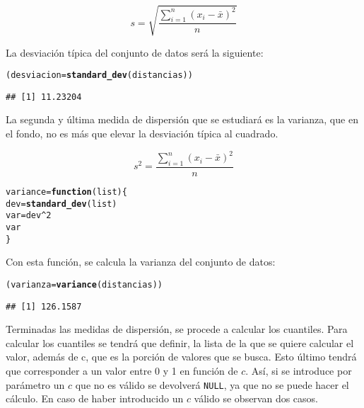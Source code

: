 \documentclass[12pt]{report}\usepackage[]{graphicx}\usepackage[dvipsnames]{xcolor}
\makeatletter
\newcommand{\hlnum}[1]{\textcolor[rgb]{0.686,0.059,0.569}{#1}}%
\newcommand{\hlopt}[1]{\textcolor[rgb]{0,0,0}{#1}}%
\newcommand{\hlstd}[1]{\textcolor[rgb]{0.345,0.345,0.345}{#1}}%
\newcommand{\hlkwa}[1]{\textcolor[rgb]{0.161,0.373,0.58}{\textbf{#1}}}%
\newcommand{\hlkwb}[1]{\textcolor[rgb]{0.69,0.353,0.396}{#1}}%
\newcommand{\hlkwc}[1]{\textcolor[rgb]{0.333,0.667,0.333}{#1}}%
\newcommand{\hlkwd}[1]{\textcolor[rgb]{0.737,0.353,0.396}{\textbf{#1}}}%
\newenvironment{kframe}{%
 \def\at@end@of@kframe{}%
 \ifinner\ifhmode%
  \def\at@end@of@kframe{\end{minipage}}%
  \begin{minipage}{\columnwidth}%
 \fi\fi%
 \def\FrameCommand##1{\hskip\@totalleftmargin \hskip-\fboxsep
 \colorbox{shadecolor}{##1}\hskip-\fboxsep
     \hskip-\linewidth \hskip-\@totalleftmargin \hskip\columnwidth}%
 \MakeFramed {\advance\hsize-\width
   \@totalleftmargin\z@ \linewidth\hsize
   \@setminipage}}%
 {\par\unskip\endMakeFramed%
 \at@end@of@kframe}
\newenvironment{knitrout}{}{} %
\makeatother
\begin{document}
			$$
			s = \sqrt{\frac{\displaystyle\sum_{i=1}^n (x_i-\bar{x})^2}{n}}
			$$
			
			La desviación típica del conjunto de datos será la siguiente:
			
\begin{knitrout}
\color{fgcolor}\begin{kframe}
\begin{alltt}
\hlstd{(desviacion} \hlkwb{=} \hlkwd{standard_dev}\hlstd{(distancias))}
\end{alltt}
\begin{verbatim}
## [1] 11.23204
\end{verbatim}
\end{kframe}
\end{knitrout}
			
			La segunda y última medida de dispersión que se estudiará es la varianza, que en el fondo, no es más que elevar la desviación típica al cuadrado.
			
			$$
			s^2 = \frac{\displaystyle\sum_{i=1}^n (x_i-\bar{x})^2}{n}
			$$
			
\begin{knitrout}
\color{fgcolor}\begin{kframe}
\begin{alltt}
\hlstd{variance} \hlkwb{=} \hlkwa{function}\hlstd{(}\hlkwc{list}\hlstd{) \{}
        \hlstd{dev} \hlkwb{=} \hlkwd{standard_dev}\hlstd{(list)}
        \hlstd{var} \hlkwb{=} \hlstd{dev}\hlopt{^}\hlnum{2}
        \hlstd{var}
\hlstd{\}}
\end{alltt}
\end{kframe}
\end{knitrout}
			
			Con esta función, se calcula la varianza del conjunto de datos:
			
\begin{knitrout}
\color{fgcolor}\begin{kframe}
\begin{alltt}
\hlstd{(varianza} \hlkwb{=} \hlkwd{variance}\hlstd{(distancias))}
\end{alltt}
\begin{verbatim}
## [1] 126.1587
\end{verbatim}
\end{kframe}
\end{knitrout}
			
			Terminadas las medidas de dispersión, se procede a calcular los cuantiles. Para calcular los cuantiles se tendrá que definir, la lista de la que se quiere calcular el valor, además de c, que es la porción de valores que se busca. Esto último tendrá que corresponder a un valor entre 0 y 1 en función de $c$. Así, si se introduce por parámetro un $c$ que no es válido se devolverá \texttt{NULL}, ya que no se puede hacer el cálculo. En caso de haber introducido un $c$ válido se observan dos casos.
			
\end{document}
